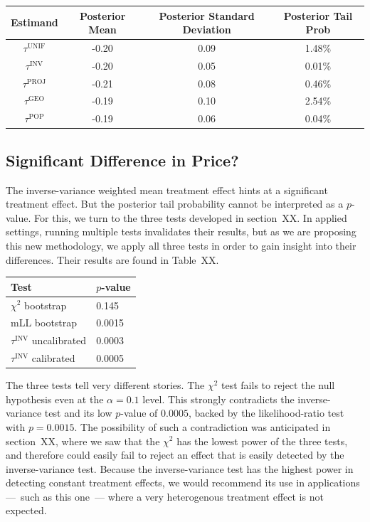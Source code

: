 \documentclass[letter]{article}
\newcommand{\unifavg}{\tau^{\mathrm{UNIF}}}
\newcommand{\invvar}{\tau^{\mathrm{INV}}}
\newcommand{\tauproj}{\tau^{\mathrm{PROJ}}}
\newcommand{\taugeo}{\tau^{\mathrm{GEO}}}
\newcommand{\taupop}{\tau^{\mathrm{POP}}}
\begin{document}
    	\begin{longtable}[]{@{}cccc@{}}
\toprule
Estimand & Posterior Mean & Posterior Standard Deviation & Posterior Tail Prob\tabularnewline
\midrule
\endhead
\(\unifavg\) & -0.20 & 0.09 & 1.48\%\tabularnewline
\(\invvar\) & -0.20 & 0.05 & 0.01\%\tabularnewline
\(\tauproj\) & -0.21 & 0.08 & 0.46\%\tabularnewline
\(\taugeo\) & -0.19 & 0.10 & 2.54\%\tabularnewline
\(\taupop\) & -0.19 & 0.06 & 0.04\%\tabularnewline
\bottomrule
\end{longtable}
    


    	\subsection{Significant Difference in Price?}\label{significant-difference-in-price}

The inverse-variance weighted mean treatment effect hints at a significant treatment effect.
But the posterior tail probability cannot be interpreted as a \(p\)-value.
For this, we turn to the three tests developed in section~XX.
In applied settings, running multiple tests invalidates their results,
but as we are proposing this new methodology,
we apply all three tests in order to gain insight into their differences.
Their results are found in Table~XX.

\begin{longtable}[]{@{}ll@{}}
\toprule
Test & \(p\)-value\tabularnewline
\midrule
\endhead
\(\chi^2\) bootstrap & 0.145\tabularnewline
mLL bootstrap & 0.0015\tabularnewline
\(\invvar\) uncalibrated & 0.0003\tabularnewline
\(\invvar\) calibrated & 0.0005\tabularnewline
\bottomrule
\end{longtable}

The three tests tell very different stories.
The \(\chi^2\) test fails to reject the null hypothesis even at the \(\alpha=0.1\) level.
This strongly contradicts the inverse-variance test and its low \(p\)-value of \(0.0005\),
backed by the likelihood-ratio test with \(p=0.0015\).
The possibility of such a contradiction was anticipated in section~XX, where we saw that the \(\chi^2\) has the lowest power of the three tests, and therefore could easily fail to reject an effect that is easily detected by the inverse-variance test.
Because the inverse-variance test has the highest power in detecting constant treatment effects, we would recommend its use in applications ---~such as this one~--- where a very heterogenous treatment effect is not expected.
    
\end{document}
